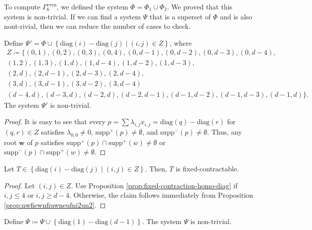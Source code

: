 To compute \(  \Gamma^{\mathrm{even}}_6 \), we defined the system \( \Phi = \Phi_1 \cup \Phi_2 \). We proved that this system is non-trivial. If we can find a system \( \Psi \) that is a superset of \( \Phi \) and is also nont-rivial, then we can reduce the number of cases to check. 

\begin{proposition}
    Define \( \Psi' = \Phi \cup \left\{ \mathrm{diag}(i) - \mathrm{diag}(j) \mid (i,j) \in Z \right\} \), where 
    \begin{gather*}
        Z \coloneqq \{ (0,1), (0,2), (0,3), (0,4), (0,d-1), (0,d-2), (0,d-3), (0,d-4),\\ (1,2), (1,3), (1, d), (1,d-4), (1,d-2), (1,d-3),\\ (2,d), (2,d-1), (2,d-3), (2, d-4),\\ (3,d), (3,d-1), (3,d-2), (3, d-4)\\
        (d-4,d), (d-3,d), (d-2,d), (d-2,d-1), (d-1,d-2), (d-1,d-3), (d-1,d)\}.
    \end{gather*}
    The system \( \Psi' \) is non-trivial.
\end{proposition}

\begin{proof}
    It is easy to see that every \( p = \sum \lambda_{i,j} x_{i,j} = \mathrm{diag}(q) - \mathrm{diag}(r) \) for \( (q,r) \in Z \) satisfies \( \lambda_{0,0} \neq 0 \), \( \mathrm{supp}^+(p) \neq \emptyset \), and \( \mathrm{supp}^-(p) \neq \emptyset \). Thus, any root \( \mathbf{w} \) of \( p \) satisfies \( \mathrm{supp}^+(p) \cap \mathrm{supp}^+(w) \neq \emptyset \) or \( \mathrm{supp}^-(p) \cap \mathrm{supp}^+(w) \neq \emptyset \).
\end{proof}

\begin{proposition}
    Let \( T \in\left\{ \mathrm{diag}(i) - \mathrm{diag}(j) \mid (i,j) \in Z \right\} \). Then, \( T \) is fixed-contractable.
\end{proposition}

\begin{proof}
    Let \( (i,j) \in Z \).
    Use Proposition \ref{prop:fixed-contraction-homo-diag} if \( i,j \leq 4 \) or \( i,j \geq d-4 \). Otherwise, the claim follows immediately from Proposition \ref{prop:nwfiewnfiuwneufni2un2}.
\end{proof}

\begin{proposition}
    Define \( \Psi \coloneqq \Psi \cup \left\{ \mathrm{diag}(1) - \mathrm{diag}(d-1) \right\}\). The system \( \Psi \) is non-trivial.
\end{proposition}


